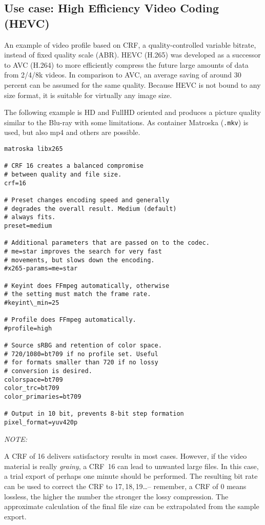 \subsection{Use case: High Efficiency Video Coding (HEVC)}%
\label{sub:use_case_hevc}

An example of video profile based on CRF, a quality-controlled
variable bitrate, instead of fixed quality scale (ABR).
HEVC (H.265) was developed as a successor to AVC (H.264) to more
efficiently compress the future large amounts of data from 2/4/8k
videos.
In comparison to AVC, an average saving of around 30 percent can be
assumed for the same quality.
Because HEVC is not bound to any size format, it is suitable for
virtually any image size.

The following example is HD and FullHD oriented and produces a
picture quality similar to the Blu-ray with some limitations.
As container Matroska (\texttt{.mkv}) is used, but also mp4 and others are
possible.

\vspace{2ex} \begin{lstlisting}[style=sh]
matroska libx265

# CRF 16 creates a balanced compromise
# between quality and file size.
crf=16

# Preset changes encoding speed and generally
# degrades the overall result. Medium (default)
# always fits.
preset=medium

# Additional parameters that are passed on to the codec.
# me=star improves the search for very fast
# movements, but slows down the encoding.
#x265-params=me=star

# Keyint does FFmpeg automatically, otherwise
# the setting must match the frame rate.
#keyint\_min=25

# Profile does FFmpeg automatically.
#profile=high

# Source sRBG and retention of color space.
# 720/1080=bt709 if no profile set. Useful
# for formats smaller than 720 if no lossy
# conversion is desired.
colorspace=bt709
color_trc=bt709
color_primaries=bt709

# Output in 10 bit, prevents 8-bit step formation
pixel_format=yuv420p
\end{lstlisting}

\noindent \textit{NOTE:}

A CRF of 16 delivers satisfactory results in most cases. However, if
the video material is really \emph{grainy}, a CRF~16 can lead to unwanted large files.  In this case, a trial export of perhaps one minute should be performed. The resulting bit rate can be used to correct the CRF to 17,\,18,\,19\ldots -- remember, a CRF of 0 means lossless, the higher the number the stronger the lossy compression. The approximate calculation of the final file size can be extrapolated from the sample export.

